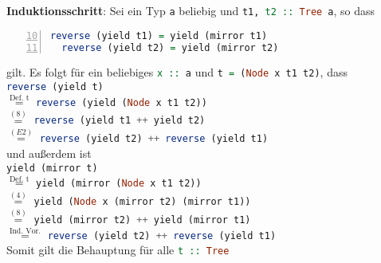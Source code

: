 \documentclass{scrreprt}
\begin{document}
\noindent
\textbf{Induktionsschritt}: Sei ein Typ
\lstinline[language=Haskell]{a} beliebig und
\lstinline[language=Haskell]{t1, t2 :: Tree a}, so dass
\begin{lstlisting}[firstnumber=10, language=Haskell, numbers=left]
  reverse (yield t1) = yield (mirror t1)
  reverse (yield t2) = yield (mirror t2)
\end{lstlisting}
gilt.
Es folgt für ein beliebiges
\lstinline[language=Haskell]{x :: a} und
\lstinline[language=Haskell]{t = (Node x t1 t2)}, dass \\
\lstinline[language=Haskell]{reverse (yield t)} \\
$\overset{\text{Def. t}}=$
\lstinline[language=Haskell]{reverse (yield (Node x t1 t2))} \\
$\overset{(8)}=$
\lstinline[language=Haskell]{reverse (yield t1 ++ yield t2)} \\
$\overset{(E2)}=$
\lstinline[language=Haskell]{reverse (yield t2) ++ reverse (yield t1)} \\

und außerdem ist \\
\lstinline[language=Haskell]{yield (mirror t)} \\
$\overset{\text{Def. t}}=$
\lstinline[language=Haskell]{yield (mirror (Node x t1 t2))} \\
$\overset{(4)}=$
\lstinline[language=Haskell]{yield (Node x (mirror t2) (mirror t1))} \\
$\overset{(8)}=$
\lstinline[language=Haskell]{yield (mirror t2) ++ yield (mirror t1)} \\
$\overset{\text{Ind. Vor.}}=$
\lstinline[language=Haskell]{reverse (yield t2) ++ reverse (yield t1)} \\

Somit gilt die Behauptung für alle \lstinline[language=Haskell]{t :: Tree}
\end{document}
